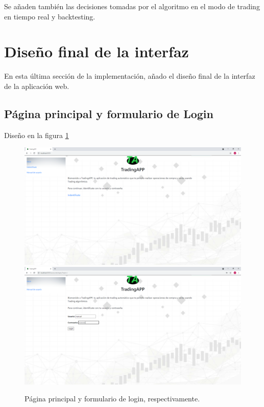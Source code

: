 Se añaden también las decisiones tomadas por el algoritmo en el modo de trading en tiempo real y backtesting.\newline




\section{Diseño final de la interfaz}

En esta última sección de la implementación, añado el diseño final de la interfaz de la aplicación web.

\subsection{Página principal y formulario de Login}

Diseño en la figura \ref{1}

\begin{figure}[h]
	\includegraphics[width=1.2\textwidth]{imagenes/diseno_final/pagina_principal.png}\newline \\
	\includegraphics[width=1.2\textwidth]{imagenes/diseno_final/login.png}
	
	\caption{Página principal y formulario de login, respectivamente.} \label{1}
\end{figure}


